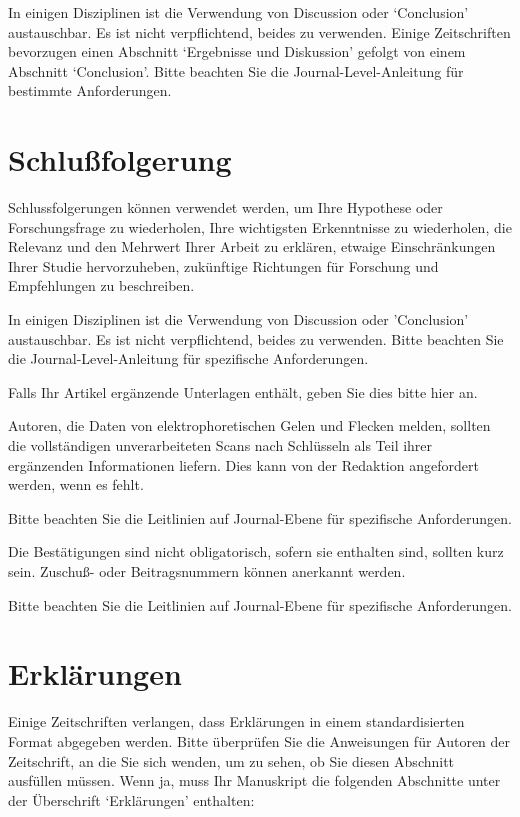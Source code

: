 \documentclass[pdflatex,sn-mathphys-num]{sn-jnl}%
\theoremstyle{thmstyleone}%
\theoremstyle{thmstyletwo}%
\theoremstyle{thmstylethree}%
\begin{document}
In einigen Disziplinen ist die Verwendung von Discussion oder `Conclusion' austauschbar. Es ist nicht verpflichtend, beides zu verwenden. Einige Zeitschriften bevorzugen einen Abschnitt `Ergebnisse und Diskussion' gefolgt von einem Abschnitt `Conclusion'. Bitte beachten Sie die Journal-Level-Anleitung für bestimmte Anforderungen. 

\section{Schlußfolgerung}\label{sec13}

Schlussfolgerungen können verwendet werden, um Ihre Hypothese oder Forschungsfrage zu wiederholen, Ihre wichtigsten Erkenntnisse zu wiederholen, die Relevanz und den Mehrwert Ihrer Arbeit zu erklären, etwaige Einschränkungen Ihrer Studie hervorzuheben, zukünftige Richtungen für Forschung und Empfehlungen zu beschreiben.

In einigen Disziplinen ist die Verwendung von Discussion oder 'Conclusion' austauschbar. Es ist nicht verpflichtend, beides zu verwenden. Bitte beachten Sie die Journal-Level-Anleitung für spezifische Anforderungen.

\backmatter


Falls Ihr Artikel ergänzende Unterlagen enthält, geben Sie dies bitte hier an.

Autoren, die Daten von elektrophoretischen Gelen und Flecken melden, sollten die vollständigen unverarbeiteten Scans nach Schlüsseln als Teil ihrer ergänzenden Informationen liefern. Dies kann von der Redaktion angefordert werden, wenn es fehlt.

Bitte beachten Sie die Leitlinien auf Journal-Ebene für spezifische Anforderungen.


Die Bestätigungen sind nicht obligatorisch, sofern sie enthalten sind, sollten kurz sein. Zuschuß- oder Beitragsnummern können anerkannt werden.

Bitte beachten Sie die Leitlinien auf Journal-Ebene für spezifische Anforderungen.

\section*{Erklärungen}

Einige Zeitschriften verlangen, dass Erklärungen in einem standardisierten Format abgegeben werden. Bitte überprüfen Sie die Anweisungen für Autoren der Zeitschrift, an die Sie sich wenden, um zu sehen, ob Sie diesen Abschnitt ausfüllen müssen. Wenn ja, muss Ihr Manuskript die folgenden Abschnitte unter der Überschrift `Erklärungen' enthalten:
\end{document}
